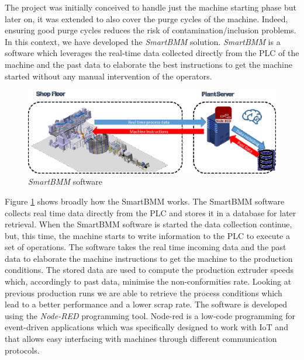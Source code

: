 The project was initially conceived to handle just the machine starting phase but later on, it was extended to also cover the purge cycles of the machine. Indeed, ensuring good purge cycles reduces the risk of contamination/inclusion problems. In this context, we have developed the \textit{SmartBMM} solution. \textit{SmartBMM} is a software which leverages the real-time data collected directly from the PLC of the machine and the past data to elaborate the best instructions to get the machine started without any manual intervention of the operators.

\begin{figure}
\centerline{\includegraphics[scale=1]{images/chapter_3/SmartBMM.eps}}
\caption{\textit{SmartBMM} software}
\label{fig:SmartBMM}
\end{figure}

Figure \ref{fig:SmartBMM} shows broadly how the SmartBMM works. The SmartBMM software collects real time data directly from the PLC and stores it in a database for later retrieval. When the SmartBMM software is started the data collection continue, but, this time, the machine starts to write information to the PLC to execute a set of operations. The software takes the real time incoming data and the past data to elaborate the machine instructions to get the machine to the production conditions. The stored data are used to compute the production extruder speeds which, accordingly to past data, minimise the non-conformities rate. Looking at previous production runs we are able to retrieve the process conditions which lead to a better performance and a lower scrap rate. The software is developed using the \textit{Node-RED} \citep{nodered} programming tool. Node-red is a low-code programming for event-driven applications which was specifically designed to work with IoT and that allows easy interfacing with machines through different communication protocols.


